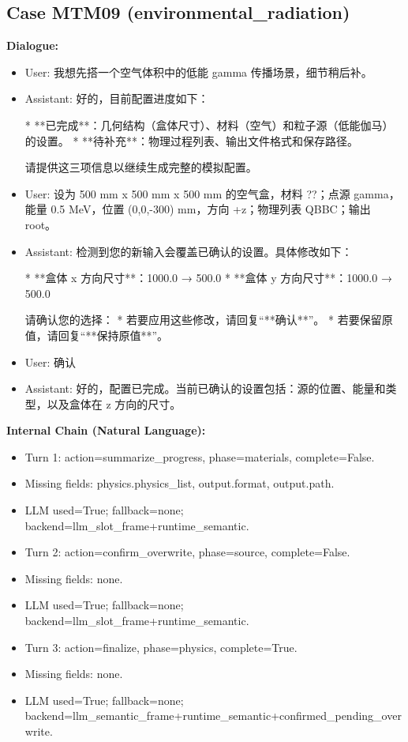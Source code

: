 \documentclass[11pt]{ctexart}
\begin{document}
\subsection{Case MTM09 (environmental\_radiation)}
\textbf{Dialogue:}
\begin{itemize}
\item User: 我想先搭一个空气体积中的低能 gamma 传播场景，细节稍后补。
\item Assistant: 好的，目前配置进度如下：

*   **已完成**：几何结构（盒体尺寸）、材料（空气）和粒子源（低能伽马）的设置。
*   **待补充**：物理过程列表、输出文件格式和保存路径。

请提供这三项信息以继续生成完整的模拟配置。
\item User: 设为 500 mm x 500 mm x 500 mm 的空气盒，材料 ??；点源 gamma，能量 0.5 MeV，位置 (0,0,-300) mm，方向 +z；物理列表 QBBC；输出 root。
\item Assistant: 检测到您的新输入会覆盖已确认的设置。具体修改如下：

*   **盒体 x 方向尺寸**：1000.0 → 500.0
*   **盒体 y 方向尺寸**：1000.0 → 500.0

请确认您的选择：
*   若要应用这些修改，请回复“**确认**”。
*   若要保留原值，请回复“**保持原值**”。
\item User: 确认
\item Assistant: 好的，配置已完成。当前已确认的设置包括：源的位置、能量和类型，以及盒体在 z 方向的尺寸。
\end{itemize}
\textbf{Internal Chain (Natural Language):}
\begin{itemize}
\item Turn 1: action=summarize\_progress, phase=materials, complete=False.
\item Missing fields: physics.physics\_list, output.format, output.path.
\item LLM used=True; fallback=none; backend=llm\_slot\_frame+runtime\_semantic.
\item Turn 2: action=confirm\_overwrite, phase=source, complete=False.
\item Missing fields: none.
\item LLM used=True; fallback=none; backend=llm\_slot\_frame+runtime\_semantic.
\item Turn 3: action=finalize, phase=physics, complete=True.
\item Missing fields: none.
\item LLM used=True; fallback=none; backend=llm\_semantic\_frame+runtime\_semantic+confirmed\_pending\_overwrite.
\end{itemize}
\end{document}
